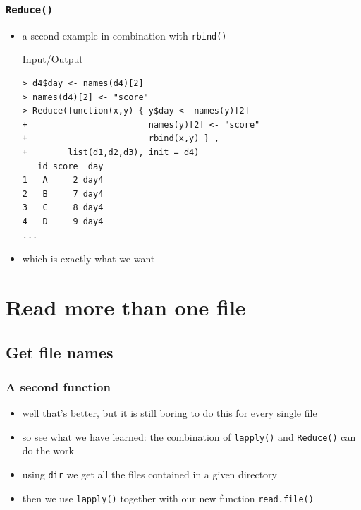 \documentclass[xcolor={table},c]{beamer}
\begin{document}
\begin{frame}[fragile]\frametitle{\texttt{Reduce()}}
  \begin{itemize}
  \item a second example in combination with \texttt{rbind()}
  \begin{exampleblock}{Input/Output}\small
\begin{verbatim}
> d4$day <- names(d4)[2]
> names(d4)[2] <- "score"
> Reduce(function(x,y) { y$day <- names(y)[2]
+                        names(y)[2] <- "score"
+                        rbind(x,y) } ,
+        list(d1,d2,d3), init = d4)
   id score  day
1   A     2 day4
2   B     7 day4
3   C     8 day4
4   D     9 day4
...
\end{verbatim}
  \end{exampleblock}
\item which is exactly what we want
  \end{itemize}
\end{frame}

\section{Read more than one file}
\subsection{Get file names}
\begin{frame}[fragile]\frametitle{A second function}
  \begin{itemize}
  \item well that's better, but it is still boring to do this for every single file
  \item so see what we have learned: the combination of \texttt{lapply()} and \texttt{Reduce()} can do the work 
  \item using \texttt{dir{}} we get all the files contained in a given directory
  \item then we use \texttt{lapply()} together with our new function \texttt{read.file()}
  \end{itemize}
\end{frame}
\end{document}
